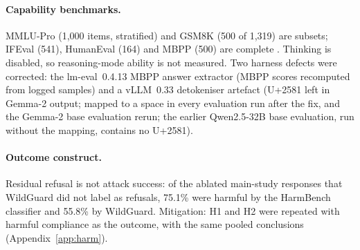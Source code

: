 \paragraph{Capability benchmarks.}
MMLU-Pro (1,000 items, stratified) and GSM8K (500 of 1,319) are subsets; IFEval
(541), HumanEval (164) and MBPP (500) are complete
\cite{wang2024mmlupro,cobbe2021training,zhou2023instruction,chen2021evaluating,austin2021program}. Thinking is disabled, so
reasoning-mode ability is not measured. Two harness defects were corrected: the
lm-eval~0.4.13 MBPP answer extractor (MBPP scores recomputed from logged
samples) and a vLLM~0.33 detokeniser artefact (U+2581 left in Gemma-2 output;
mapped to a space in every evaluation run after the fix, and the Gemma-2 base
evaluation rerun; the earlier Qwen2.5-32B base evaluation, run without the
mapping, contains no U+2581).

\paragraph{Outcome construct.}
Residual refusal is not attack success: of the ablated main-study responses
that WildGuard did not label as refusals, 75.1\% were harmful by the HarmBench
classifier and 55.8\% by WildGuard. Mitigation: H1 and H2 were repeated with
harmful compliance as the outcome, with the same pooled conclusions
(Appendix~\ref{app:harm}).

